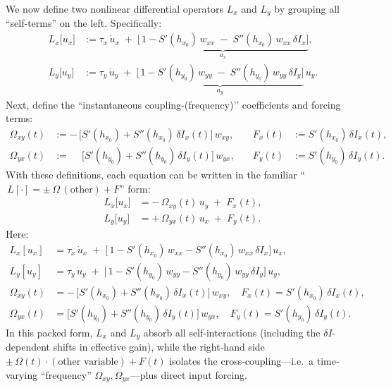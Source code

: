  
We now define two nonlinear differential operators \(L_x\) and \(L_y\) by grouping all ``self‐terms'' on the left.  Specifically:
\[
\begin{aligned}
L_x\bigl[u_x\bigr]
&:= \tau_x\,\dot u_x 
\;+\; \underbrace{\bigl[\,1 - S'(h_{x_0})\,w_{xx} \;-\; S''(h_{x_0})\,w_{xx}\,\delta I_x \bigr]}_{a_x},\\[0.6em]
L_y\bigl[u_y\bigr]
&:= \tau_y\,\dot u_y 
\;+\; \underbrace{\bigl[\,1 - S'(h_{y_0})\,w_{yy} \;-\; S''(h_{y_0})\,w_{yy}\,\delta I_y \bigr]}_{a_y}\,u_y.
\end{aligned}
\]
Next, define the ``instantaneous coupling‐(frequency)’’ coefficients and forcing terms:
\[
\begin{aligned}
\Omega_{xy}(t) 
&:= -\,\bigl[S'(h_{x_0}) + S''(h_{x_0})\,\delta I_x(t)\bigr]\,w_{xy}, 
&\quad 
F_x(t) &:= S'(h_{x_0})\,\delta I_x(t),\\[0.5em]
\Omega_{yx}(t)
&:= \phantom{-}\bigl[S'(h_{y_0}) + S''(h_{y_0})\,\delta I_y(t)\bigr]\,w_{yx},
&\quad 
F_y(t) &:= S'(h_{y_0})\,\delta I_y(t).
\end{aligned}
\]
With these definitions, each equation can be written in the familiar ``\(\,L[\cdot] = \pm\,\Omega\,(\text{other}) + F\)'' form:
\[
\boxed{
\begin{aligned}
L_x\bigl[u_x\bigr] 
&= -\,\Omega_{xy}(t)\,u_y \;+\; F_x(t),\\[0.7em]
L_y\bigl[u_y\bigr] 
&= +\,\Omega_{yx}(t)\,u_x \;+\; F_y(t).
\end{aligned}
}
\]
Here:
\[
\begin{aligned}
L_x[u_x] 
&= \tau_x\,\dot u_x 
\;+\; \bigl[\,1 - S'(h_{x_0})\,w_{xx} - S''(h_{x_0})\,w_{xx}\,\delta I_x \bigr]\,u_x,\\
L_y[u_y] 
&= \tau_y\,\dot u_y 
\;+\; \bigl[\,1 - S'(h_{y_0})\,w_{yy} - S''(h_{y_0})\,w_{yy}\,\delta I_y \bigr]\,u_y,\\
\Omega_{xy}(t) 
&= -\,\bigl[S'(h_{x_0}) + S''(h_{x_0})\,\delta I_x(t)\bigr]\,w_{xy},
\quad F_x(t) = S'(h_{x_0})\,\delta I_x(t),\\
\Omega_{yx}(t)
&= \bigl[S'(h_{y_0}) + S''(h_{y_0})\,\delta I_y(t)\bigr]\,w_{yx},
\quad F_y(t) = S'(h_{y_0})\,\delta I_y(t).
\end{aligned}
\]
In this packed form, \(L_x\) and \(L_y\) absorb all self‐interactions (including the \(\delta I\)-dependent shifts in effective gain), while the right‐hand side \(\pm\,\Omega(t)\cdot(\text{other variable}) + F(t)\) isolates the cross‐coupling—i.e.\ a time‐varying ``frequency'' \(\Omega_{xy},\Omega_{yx}\)—plus direct input forcing.

